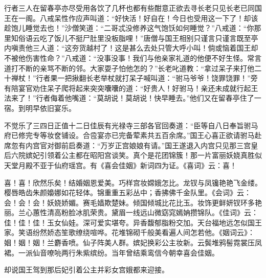 \documentclass[12pt,UTF8]{ctexbook}
\begin{document}
{	行者三人在留春亭亦尽受用各饮了几杯也都有些酣意正欲去寻长老只见长老已同国王在一阁。八戒呆性作应声叫道：“好快活！好自在！今日也受用这一下了！却该趁饱儿睡觉去也！”沙僧笑道：“二哥忒没修养这气饱饫如何睡觉？”八戒道：“你那里知俗语云吃了饭儿不挺尸肚里没板脂哩！”唐僧与国王相别只谨言只谨言既至亭内嗔责他三人道：“这夯货越村了！这是甚么去处只管大呼小叫！倘或恼着国王却不被他伤害性命？”八戒道：“没事没事！我们与他亲家礼道的他便不好生怪。常言道打不断的亲骂不断的邻。大家耍子怕他怎的？”长老叱道教：“拿过呆子来打他二十禅杖！”行者果一把揪翻长老举杖就打呆子喊叫道：“驸马爷爷！饶罪饶罪！”旁有陪宴官劝住呆子爬将起来突突囔囔的道：“好贵人！好驸马！亲还未成就行起王法来了！”行者侮着他嘴道：“莫胡说！莫胡说！快早睡去。”他们又在留春亭住了一宿。到明早依旧宴乐。
	
	不觉乐了三四日正值十二日佳辰有光禄寺三部各官回奏道：“臣等自八日奉旨驸马府已修完专等妆奁铺设。合卺宴亦已完备荤素共五百余席。”国王心喜正欲请驸马赴席忽有内宫官对御前启奏道：“万岁正宫娘娘有请。”国王遂退入内宫只见那三宫皇后六院嫔妃引领着公主都在昭阳宫谈笑。真个是花团锦簇！那一片富丽妖娆真胜似天堂月殿不亚于仙府瑶宫。有《喜会佳姻》新词四为证。《喜词》云：喜！
	
	喜！喜！欣然乐矣！结婚姻恩爱美。巧样宫妆嫦娥怎比。龙钗与凤镵艳艳飞金缕。樱唇皓齿朱颜嬝娜如花轻体。锦重重五彩丛中；香拂佛千金队里。《会词》云：会！会！会！妖娆娇媚。赛毛嫱欺楚妹。倾国倾城比花比玉。妆饰更鲜妍钗环多艳丽。兰心蕙性清高粉脸冰肌荣贵。黛眉一线远山微窈窕嫣姌攒锦队。《佳词》云：佳！佳！佳！玉女仙娃。深可爱实堪夸。异香馥郁脂粉交加。天台福地远怎似国王家。笑语纷然娇态笙歌缭绕喧哗。花堆锦砌千般美看遍人间怎若他。《姻词云》：姻！姻！姻！兰麝香喷。仙子阵美人群。嫔妃换彩公主妆新。云鬓堆鸦髻霓裳压凤裙。一派仙音嘹喨两行朱紫缤纷。当年曾结乘鸾信今朝幸喜会佳姻。
	
	却说国王驾到那后妃引着公主并彩女宫娥都来迎接。
	
}
\end{document}
